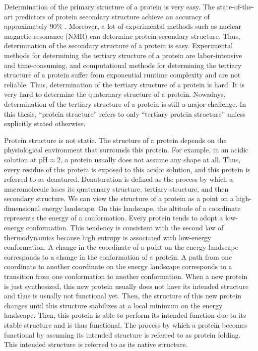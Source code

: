 Determination of the primary structure of a protein is very easy. 
The state-of-the-art predictors of protein secondary structure achieve an accuracy of approximately 90\% \cite{6217208}.
Moreover, a lot of experimental methods such as nuclear magnetic resonance (NMR) can determine protein secondary structure.
Thus, determination of the secondary structure of a protein is easy.
Experimental methods for determining the tertiary structure of a protein are labor-intensive and time-consuming,
	and computational methods for determining the tertiary structure of a protein suffer from exponential runtime complexity and are not reliable.
Thus, determination of the tertiary structure of a protein is hard.
It is very hard to determine the quaternary structure of a protein. 
Nowadays, determination of the tertiary structure of a protein is still a major challenge. 
In this thesis, ``protein structure'' refers to only ``tertiary protein structure'' unless explicitly stated otherwise. 

Protein structure is not static. 
The structure of a protein depends on the physiological environment that surrounds this protein. 
For example, in an acidic solution at pH\(\approx\)2, a protein usually does not assume any shape at all. 
Thus, every residue of this protein is exposed to this acidic solution, and this protein is referred to as denatured.
Denaturation is defined as the process by which a macromolecule loses its quaternary structure, tertiary structure, and then secondary structure.   
We can view the structure of a protein as a point on a high-dimensional energy landscape. 
On this landscape, the altitude of a coordinate represents the energy of a conformation. 
Every protein tends to adopt a low-energy conformation.
This tendency is consistent with the second law of thermodynamics because high entropy is associated with low-energy conformation. 
A change in the coordinate of a point on the energy landscape corresponds to a change in the conformation of a protein. 
A path from one coordinate to another coordinate on the energy landscape corresponds to a transition from one conformation to another conformation. 
When a new protein is just synthesized, this new protein usually does not have its intended structure and thus is usually not functional yet.{} 
Then, the structure of this new protein changes until this structure stabilizes at a local minimum on the energy landscape.{} 
Then, this protein is able to perform its intended function due to its stable structure and is thus functional.
The process by which a protein becomes functional by assuming its intended structure is referred to as protein folding.
This intended structure is referred to as its native structure.

